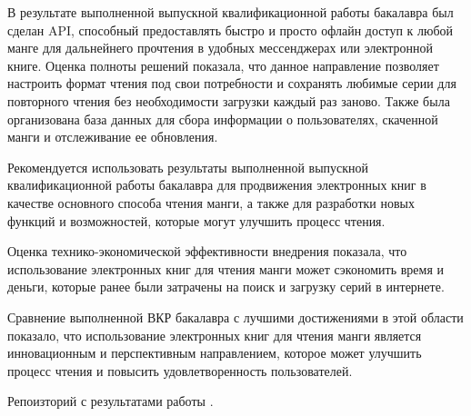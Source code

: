 \conclusion

В результате выполненной выпускной квалификационной работы бакалавра был сделан API, способный предоставлять быстро и просто офлайн доступ к любой манге для дальнейнего прочтения в удобных мессенджерах или электронной книге.
Оценка полноты решений показала, что данное направление позволяет настроить формат чтения под свои потребности и сохранять любимые серии для повторного чтения без необходимости загрузки каждый раз заново.
Также была организована база данных для сбора информации о пользователях, скаченной манги и отслеживание ее обновления.

Рекомендуется использовать результаты выполненной выпускной квалификационной работы бакалавра для продвижения электронных книг в качестве основного способа чтения манги, 
а также для разработки новых функций и возможностей, которые могут улучшить процесс чтения.

Оценка технико-экономической эффективности внедрения показала, что использование электронных книг для чтения манги может сэкономить время и деньги, 
которые ранее были затрачены на поиск и загрузку серий в интернете.

Сравнение выполненной ВКР бакалавра с лучшими достижениями в этой области показало, 
что использование электронных книг для чтения манги является инновационным и перспективным направлением, 
которое может улучшить процесс чтения и повысить удовлетворенность пользователей.

Репоизторий с результатами работы \cite{result-cite}.